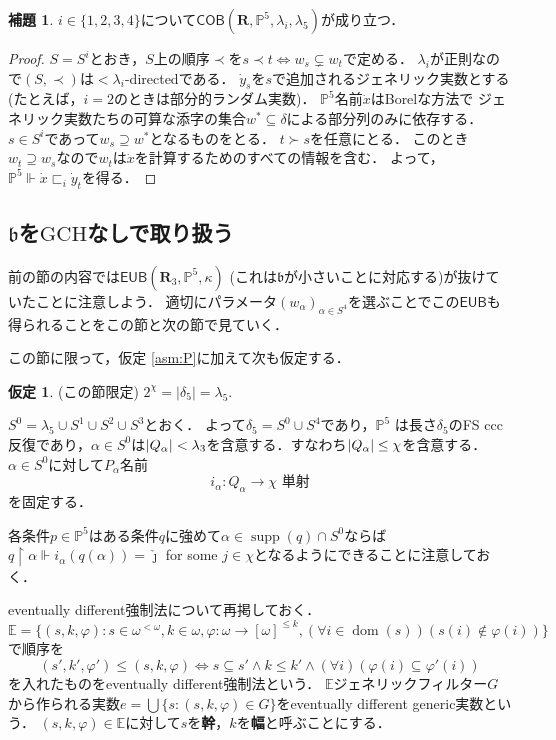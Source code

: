 \documentclass[uplatex,dvipdfmx]{jsarticle}
\newcommand{\dom}{\operatorname{dom}}
\newcommand\forces{\Vdash}
\newcommand{\frakb}{\mathfrak{b}}
\newcommand{\GCH}{\mathrm{GCH}}
\newcommand{\EUB}{\mathsf{EUB}}
\newcommand{\COB}{\mathsf{COB}}
\newcommand{\relR}{\mathbf{R}}
\newcommand{\supp}{\operatorname{supp}}
\newcommand{\Pa}{\mathbb{P}^5}
\DeclarePairedDelimiter\abs{\lvert}{\rvert}
\renewcommand\subset{\subseteq}
\theoremstyle{definition}
\newtheorem{lem}[thm]{補題}
\newtheorem{assumption}[thm]{仮定}
\begin{document}
	\begin{lem}
		$i \in \{1,2,3,4\}$について$\COB(\relR, \Pa, \lambda_i, \lambda_5)$が成り立つ．
	\end{lem}
	\begin{proof}
		$S=S^i$とおき，$S$上の順序$\prec$を$s\prec t \iff w_s\subsetneq w_t$で定める．
		$\lambda_i$が正則なので$(S,\prec)$は${<}\lambda_i$-directedである．
		$\dot{y}_s$を$s$で追加されるジェネリック実数とする (たとえば，$i=2$のときは部分的ランダム実数)．
		$\Pa$名前$\dot{x}$はBorelな方法で 
		ジェネリック実数たちの可算な添字の集合$w^*\subseteq \delta$による部分列のみに依存する．
		$s\in S^i$であって$w_s\supseteq w^*$となるものをとる．
		$t\succ s$を任意にとる．
		このとき$w_t\supseteq w_s$なので$w_t$は$\dot{x}$を計算するためのすべての情報を含む．
		よって，$\Pa \forces \dot{x} \sqsubset_i \dot{y}_t$を得る．
	\end{proof}
	
	\subsection{$\frakb$を$\GCH$なしで取り扱う}
	
	前の節の内容では$\EUB(\relR_3, \Pa, \kappa)$ (これは$\frakb$が小さいことに対応する)が抜けていたことに注意しよう．
	適切にパラメータ$(w_\alpha)_{\alpha \in S^4}$を選ぶことでこの$\EUB$も得られることをこの節と次の節で見ていく．
	
	この節に限って，仮定 \ref{asm:P}に加えて次も仮定する．
	
	\begin{assumption}\label{asm:chi}
		(この節限定) $2^\chi =|\delta_5|= \lambda_5$.
	\end{assumption}
	
	$S^0=\lambda_5\cup S^1\cup S^2\cup S^3$とおく．
	よって$\delta_5=S^0\cup S^4$であり，$\Pa$ は長さ$\delta_5$のFS ccc反復であり，$\alpha\in S^0$は$\abs{Q_\alpha}<\lambda_3$を含意する．すなわち$\abs{Q_\alpha}\le\chi$を含意する．
	$\alpha \in S^0$に対して$P_\alpha$名前
	\begin{equation}\label{eq:ia}
		i_\alpha:Q_\alpha\to\chi\text{ 単射}
	\end{equation}
	を固定する．
	
	各条件$p\in \Pa$はある条件$q$に強めて$\alpha\in \supp(q)\cap S^0$ならば $q\restriction\alpha\forces i_\alpha(q(\alpha))=\check \jmath$ for some 
	$j\in\chi$となるようにできることに注意しておく．
	
	eventually different強制法について再掲しておく．
	$\mathbb{E} = \{ (s,k,\varphi) : s \in \omega^{<\omega}, k \in \omega, \varphi \colon \omega \to [\omega]^{\le k}, (\forall i \in \dom(s))(s(i) \not \in \varphi(i)) \}$で順序を
	\[
	(s', k', \varphi') \le (s, k, \varphi) \iff s \subset s' \land k \le k' \land (\forall i)(\varphi(i) \subset \varphi'(i))
	\]
	を入れたものをeventually different強制法という．	
	$\mathbb{E}$ジェネリックフィルター$G$から作られる実数$e = \bigcup \{ s  : (s, k, \varphi) \in G \}$をeventually different generic実数という．
	$(s, k, \varphi) \in \mathbb{E}$に対して$s$を\textbf{幹}，$k$を\textbf{幅}と呼ぶことにする．
	
\end{document}
